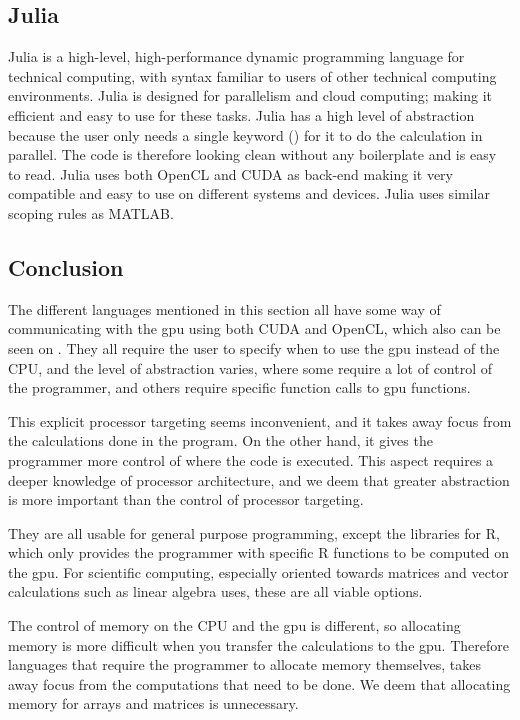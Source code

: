 \subsection{Julia}
Julia is a high-level, high-performance dynamic programming language for technical computing, with syntax familiar to users of other technical computing environments.
Julia is designed for parallelism and cloud computing; making it efficient and easy to use for these tasks.
Julia has a high level of abstraction because the user only needs a single keyword (\@parallel) for it to do the calculation in parallel.
The code is therefore looking clean without any boilerplate and is easy to read.
Julia uses both OpenCL and CUDA as back-end making it very compatible and easy to use on different systems and devices.
Julia uses similar scoping rules as MATLAB.\citep{Julia_Git, Julia_scope,Julia}

 

\subsection{Conclusion}  

The different languages mentioned in this section all have some way of communicating with the \acrshort{gpu} using both CUDA and OpenCL, which also can be seen on .
They all require the user to specify when to use the \acrshort{gpu} instead of the CPU, and the level of abstraction varies, where some require a lot of control of the programmer, and others require specific function calls to \acrshort{gpu} functions.

This explicit processor targeting seems inconvenient, and it takes away focus from the calculations done in the program.
On the other hand, it gives the programmer more control of where the code is executed.
This aspect requires a deeper knowledge of processor architecture, and we deem that greater abstraction is more important than the control of processor targeting.

They are all usable for general purpose programming, except the libraries for R, which only provides the programmer with specific R functions to be computed on the \acrshort{gpu}.
For scientific computing, especially oriented towards matrices and vector calculations such as linear algebra uses, these are all viable options.

The control of memory on the CPU and the \acrshort{gpu} is different, so allocating memory is more difficult when you transfer the calculations to the \acrshort{gpu}.
Therefore languages that require the programmer to allocate memory themselves, takes away focus from the computations that need to be done.
We deem that allocating memory for arrays and matrices is unnecessary.
                     
